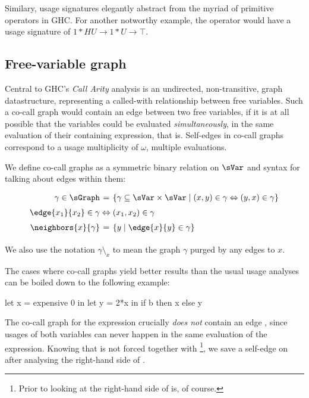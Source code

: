 Similary, usage signatures elegantly abstract from the myriad of primitive operators in GHC.
For another notworthy example, the  operator would have a usage signature of $1*HU \to 1*U \to \top$.

\subsection{Free-variable graph}\label{sec:graph}


Central to GHC's \emph{Call Arity} analysis \parencite{callarity} is an undirected, non-transitive, graph datastructure, representing a called-with relationship between free variables.
Such a co-call graph would contain an edge between two free variables, if it is at all possible that the variables could be evaluated \emph{simultaneously}, in the same evaluation of their containing expression, that is.
Self-edges in co-call graphs correspond to a usage multiplicity of $\omega$, \eg multiple evaluations.

We define co-call graphs as a symmetric binary relation on $\sVar$ and syntax for talking about edges within them:
\[\def\arraystretch{1.5}\arraycolsep=1.4pt
\begin{array}{rcl}
  \gamma \in \sGraph &=& \left\{ \gamma \subseteq \sVar \times \sVar \mid (x,y) \in \gamma \Leftrightarrow (y,x) \in \gamma \right\} \\
  \edge{x_1}{x_2}\in\gamma &\Leftrightarrow& (x_1,x_2) \in \gamma \\
  \neighbors{x}{\gamma} &=& \left\{ y \mid \edge{x}{y} \in \gamma \right\}
\end{array}
\]

We also use the notation $\gamma \setminus_x$ to mean the graph $\gamma$ purged by any edges to $x$.

The cases where co-call graphs yield better results than the usual usage analyses can be boiled down to the following example:

\begin{haskellcode}
let x = expensive 0
in let y = 2*x
   in if b 
      then x 
      else y
\end{haskellcode}

The co-call graph for the  expression crucially \emph{does not} contain an edge , since usages of both variables can never happen in the same evaluation of the expression.
Knowing that  is not forced together with \footnote{Prior to looking at the right-hand side of  is, of course.}, we save a self-edge on  after analysing the right-hand side of .

